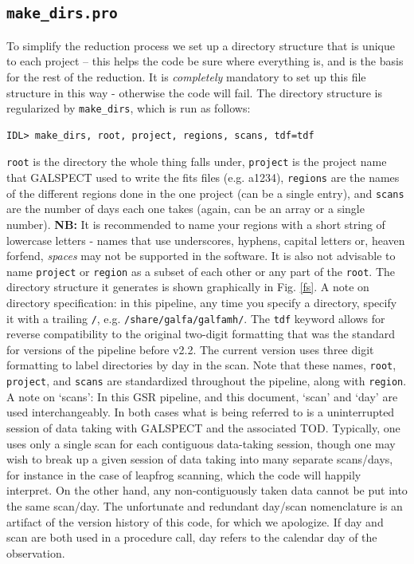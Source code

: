 \documentclass[11pt]{article}
\begin{document}
\subsection{ \texttt{make\_dirs.pro}} 
To simplify the reduction process we set up a directory structure that is unique to each project -- this helps the code be sure where everything is, and is the basis for the rest of the reduction. It is {\it completely} mandatory to set up this file structure in this way - otherwise the code will fail. The directory structure is regularized by \texttt{make\_dirs}, which is run as follows:
\begin{verbatim}
IDL> make_dirs, root, project, regions, scans, tdf=tdf
\end{verbatim}
\texttt{root} is the directory the whole thing falls under, \texttt{project} is the project name that GALSPECT used to write the fits files (e.g. a1234), \texttt{regions} are the names of the different regions done in the one project (can be a single entry), and \texttt{scans} are the number of days each one takes (again, can be an array or a single number). {\bf NB:} It is recommended to name your regions with a short string of lowercase letters - names that use underscores, hyphens, capital letters or, heaven forfend, \emph{spaces} may not be supported in the software. It is also not advisable to name \texttt{project} or \texttt{region} as a subset of each other or any part of the \texttt{root}. The directory structure it generates is shown graphically in Fig. \ref{fs}.  A note on directory specification: in this pipeline, any time you specify a directory, specify it with a trailing \texttt{/}, e.g. \texttt{/share/galfa/galfamh/}. The \texttt{tdf} keyword allows for reverse compatibility to the original two-digit formatting that was the standard for versions of the pipeline before v2.2. The current version uses three digit formatting to label directories by day in the scan. Note that these names, \texttt{root}, \texttt{project}, and \texttt{scans} are standardized throughout the pipeline, along with \texttt{region}. A note on `scans': In this GSR pipeline, and this document, `scan' and `day' are used interchangeably. In both cases what is being referred to is a uninterrupted session of data taking with GALSPECT and the associated TOD. Typically, one uses only a single scan for each contiguous data-taking session, though one may wish to break up a given session of data taking into many separate scans/days, for instance in the case of leapfrog scanning, which the code will happily interpret. On the other hand, any non-contiguously taken data cannot be put into the same scan/day. The unfortunate and redundant day/scan nomenclature is an artifact of the version history of this code, for which we apologize. If day and scan are both used in a procedure call, day refers to the calendar day of the observation.
\end{document}
